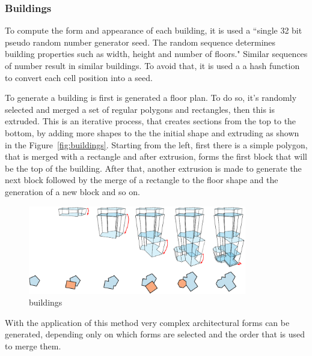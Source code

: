 
\subsubsection{Buildings} %
\label{ssub:buildings}


To compute the form and appearance of each building, it is used a ``single 32 bit pseudo random number generator seed. The random sequence determines building properties such as width, height and number of floors."
Similar sequences of number result in similar buildings. To avoid that, it is used a a hash function to convert each cell position into a seed.

To generate a building is first is generated a floor plan. To do so, it's randomly selected and merged a set of regular polygons and rectangles, then this is extruded. This is an iterative process, that creates sections from the top to the bottom, by adding more shapes to the the initial shape and extruding as shown in the Figure~\ref{fig:buildings}. Starting from the left, first there is a simple polygon, that is merged with a rectangle and after extrusion, forms the first block that will be the top of the building. After that, another extrusion is made to generate the next block followed by the merge of a rectangle to the floor shape and the generation of a new block and so on.

\begin{figure}[htbp]
	\centering
	\includegraphics[width=0.85\textwidth]{img/Real-Time-procedural-generation/Building-Generation.png}
	\caption{buildings}
	\label{fig:label}
\end{figure}

With the application of this method very complex architectural forms can be generated, depending only on which forms are selected and the order that is used to merge them.


